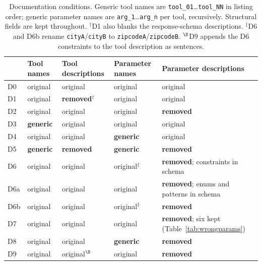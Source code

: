 \documentclass[10pt]{article}
\newcommand{\code}[1]{\texttt{#1}}
\begin{document}
\begin{table}[t]
\centering\small
\caption{Documentation conditions. Generic tool names are \code{tool\_01}\ldots\code{tool\_NN} in listing order; generic parameter names are \code{arg\_1}\ldots\code{arg\_n} per tool, recursively. Structural fields are kept throughout. $^{\dagger}$D1 also blanks the response-schema descriptions. $^{\ddagger}$D6 and D6b rename \code{cityA}/\code{cityB} to \code{zipcodeA}/\code{zipcodeB}. $^{\S}$D9 appends the D6 constraints to the tool description as sentences.}
\label{tab:conditions}
\footnotesize\setlength{\tabcolsep}{4pt}
\begin{tabular}{lllll}
\toprule
 & Tool names & Tool descriptions & Parameter names & Parameter descriptions \\
\midrule
D0 & original & original & original & original \\
D1 & original & \textbf{removed}$^{\dagger}$ & original & original \\
D2 & original & original & original & \textbf{removed} \\
D3 & \textbf{generic} & original & original & original \\
D4 & original & original & \textbf{generic} & original \\
D5 & \textbf{generic} & \textbf{removed} & \textbf{generic} & \textbf{removed} \\
\addlinespace
D6 & original & original & original$^{\ddagger}$ & \textbf{removed}; constraints in schema \\
D6a & original & original & original & \textbf{removed}; enums and patterns in schema \\
D6b & original & original & original$^{\ddagger}$ & \textbf{removed} \\
D7 & original & original & original & \textbf{removed}; six kept (Table~\ref{tab:wrongparams}) \\
D8 & original & original & \textbf{generic} & \textbf{removed} \\
D9 & original & original$^{\S}$ & original & \textbf{removed} \\
\bottomrule
\end{tabular}
\end{table}
\end{document}

